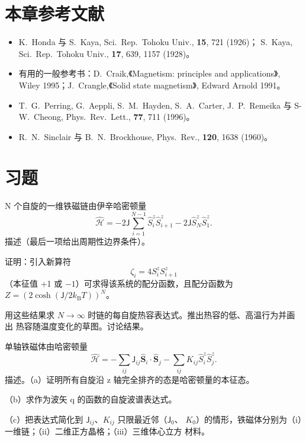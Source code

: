 \section*{本章参考文献}

\begin{itemize}[itemsep=0.2em]
\item K.~Honda 与 S.~Kaya, Sci.~Rep.~Tohoku Univ., \textbf{15}, 721 (1926)；
S.~Kaya, Sci.~Rep.~Tohoku Univ., \textbf{17}, 639, 1157 (1928)。
\item 有用的一般参考书：D.~Craik,《Magnetism: principles and applications》, Wiley
1995；J.~Crangle,《Solid state magnetism》, Edward Arnold 1991。
\item T.~G.~Perring, G.~Aeppli, S.~M.~Hayden, S.~A.~Carter, J.~P.~Remeika 与
S-W.~Cheong, Phys.~Rev.~Lett., \textbf{77}, 711 (1996)。
\item R.~N.~Sinclair 与 B.~N.~Brockhouse, Phys.~Rev., \textbf{120}, 1638 (1960)。
\end{itemize}

\section*{习题}

 N 个自旋的一维铁磁链由伊辛哈密顿量
\begin{equation*}
\hat{\mathcal{H}} = -2\mathsf{J}\sum_{i=1}^{N-1}\hat{S}_i^{z}\hat{S}_{i+1}^{z} - 2\mathsf{J}\hat{S}_N^{z}\hat{S}_1^{z}.
\end{equation*}
描述（最后一项给出周期性边界条件）。

证明：引入新算符
\begin{equation*}
\zeta_i = 4S_i^{z}S_{i+1}^{z}
\end{equation*}
（本征值 +1 或 $-1$）可求得该系统的配分函数，且配分函数为
$Z=(2\cosh(\mathsf{J}/2k_{\mathrm{B}}T))^{N}$。

用这些结果求 $N\to\infty$ 时链的每自旋热容表达式。推出热容的低、高温行为并画出
热容随温度变化的草图。讨论结果。

 单轴铁磁体由哈密顿量
\begin{equation*}
\hat{\mathcal{H}} = -\sum_{ij}\mathsf{J}_{ij}\hat{\mathbf{S}}_i\cdot\hat{\mathbf{S}}_j - \sum_{ij}K_{ij}\hat{S}_i^{z}\hat{S}_j^{z}.\tag{6.57}
\end{equation*}
描述。（a）证明所有自旋沿 z 轴完全排齐的态是哈密顿量的本征态。

（b）求作为波矢 q 的函数的自旋波谱表达式。

（c）把表达式简化到 $\mathsf{J}_{ij}$、$K_{ij}$ 只限最近邻（$\mathsf{J}_0$、
$K_0$）的情形，铁磁体分别为（i）一维链；（ii）二维正方晶格；（iii）三维体心立方
材料。

